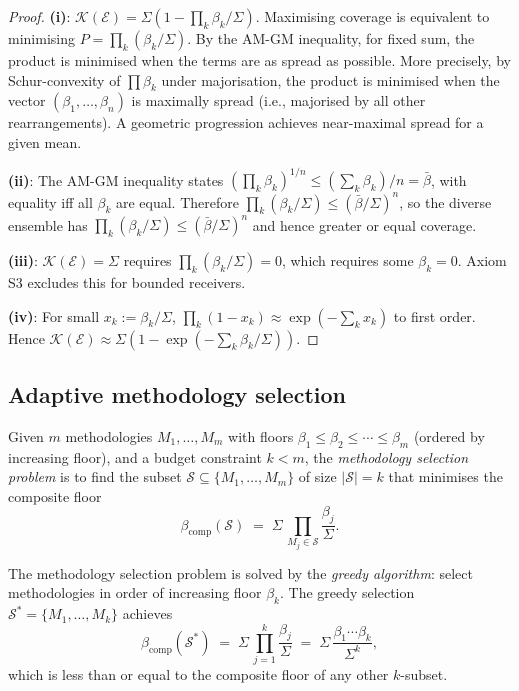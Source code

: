 \begin{proof}
\textbf{(i)}: $\mathcal{K}(\mathcal{E}) = \Sigma(1 - \prod_k \beta_k/\Sigma)$.
Maximising coverage is equivalent to minimising $P = \prod_k(\beta_k/\Sigma)$.
By the AM-GM inequality, for fixed sum, the product is minimised when the
terms are as spread as possible.  More precisely, by Schur-convexity of
$\prod \beta_k$ under majorisation, the product is minimised when the vector
$(\beta_1, \ldots, \beta_n)$ is maximally spread (i.e., majorised by all other
rearrangements).  A geometric progression achieves near-maximal spread for
a given mean.

\textbf{(ii)}: The AM-GM inequality states $(\prod_k \beta_k)^{1/n} \leq
(\sum_k \beta_k)/n = \bar\beta$, with equality iff all $\beta_k$ are equal.
Therefore $\prod_k(\beta_k/\Sigma) \leq (\bar\beta/\Sigma)^n$, so the diverse
ensemble has $\prod_k(\beta_k/\Sigma) \leq (\bar\beta/\Sigma)^n$ and hence
greater or equal coverage.

\textbf{(iii)}: $\mathcal{K}(\mathcal{E}) = \Sigma$ requires $\prod_k
(\beta_k/\Sigma) = 0$, which requires some $\beta_k = 0$.  Axiom S3 excludes
this for bounded receivers.

\textbf{(iv)}: For small $x_k := \beta_k/\Sigma$,
$\prod_k(1 - x_k) \approx \exp(-\sum_k x_k)$ to first order.  Hence
$\mathcal{K}(\mathcal{E}) \approx \Sigma(1 - \exp(-\sum_k\beta_k/\Sigma))$.
\end{proof}

\subsection{Adaptive methodology selection}

\begin{definition}
\label{def:ch02-method-selection}
Given $m$ methodologies $M_1, \ldots, M_m$ with floors $\beta_1 \leq \beta_2
\leq \cdots \leq \beta_m$ (ordered by increasing floor), and a budget
constraint $k < m$, the \emph{methodology selection problem} is to find the
subset $\mathcal{S} \subseteq \{M_1, \ldots, M_m\}$ of size $|\mathcal{S}| = k$
that minimises the composite floor
\[
  \beta_{\mathrm{comp}}(\mathcal{S})
  \;=\;
  \Sigma\,\prod_{M_j \in \mathcal{S}} \frac{\beta_j}{\Sigma}.
\]
\end{definition}

\begin{theorem}
\label{thm:ch02-greedy-selection}
The methodology selection problem is solved by the \emph{greedy algorithm}:
select methodologies in order of increasing floor $\beta_k$.  The greedy
selection $\mathcal{S}^* = \{M_1, \ldots, M_k\}$ achieves
\[
  \beta_{\mathrm{comp}}(\mathcal{S}^*)
  \;=\;
  \Sigma\,\prod_{j=1}^k \frac{\beta_j}{\Sigma}
  \;=\;
  \Sigma\,\frac{\beta_1 \cdots \beta_k}{\Sigma^k},
\]
which is less than or equal to the composite floor of any other $k$-subset.
\end{theorem}


